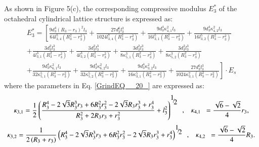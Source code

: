 \documentclass{article} %
\begin{document}
As shown in Figure 5(c), the corresponding compressive modulus $E_{3}^{*} $ of the octahedral cylindrical lattice structure is expressed as:
\begin{equation} \label{GrindEQ__20_} 
\begin{array}{l} {E_{3}^{*} =\left[\frac{9d_{3}^{4} \left(R_{3} -r_{3} \right)^{2} l_{3} }{64l_{3,4}^{5} \left(R_{3}^{2} -r_{3}^{2} \right)} +\right. \frac{27d_{3}^{6} l_{3}^{3} }{1024l_{3,4}^{7} \left(R_{3}^{2} -r_{3}^{2} \right)} +\frac{9d_{3}^{4} \kappa _{4,1}^{2} l_{3} }{16l_{3,1}^{5} \left(R_{3}^{2} -r_{3}^{2} \right)} +\frac{9d_{3}^{4} \kappa _{4,2}^{2} l_{3} }{16l_{3,2}^{5} \left(R_{3}^{2} -r_{3}^{2} \right)} } \\ {+\frac{3d_{3}^{2} l_{3}^{3} }{4l_{3,1}^{3} \left(R_{3}^{2} -r_{3}^{2} \right)} +\frac{3d_{3}^{2} l_{3}^{3} }{4l_{3,2}^{3} \left(R_{3}^{2} -r_{3}^{2} \right)} +\frac{3d_{3}^{2} l_{3}^{3} }{8\kappa _{5,1}^{3} \left(R_{3}^{2} -r_{3}^{2} \right)} +\frac{3d_{3}^{2} l_{3}^{3} }{8\kappa _{5,2}^{3} \left(R_{3}^{2} -r_{3}^{2} \right)} } \\ {+\frac{9d_{3}^{4} \kappa _{6,1}^{2} l_{3} }{32\kappa _{5,1}^{5} \left(R_{3}^{2} -r_{3}^{2} \right)} +\frac{9d_{3}^{4} \kappa _{6,2}^{2} l_{3} }{32\kappa _{5,2}^{5} \left(R_{3}^{2} -r_{3}^{2} \right)} +\frac{9d_{3}^{4} \kappa _{3,2}^{2} l_{3} }{16\kappa _{3,1}^{5} \left(R_{3}^{2} -r_{3}^{2} \right)} +\left. \frac{27d_{3}^{6} l_{3}^{3} }{1024\kappa _{3,1}^{7} \left(R_{3}^{2} -r_{3}^{2} \right)} \right]\cdot E_{s} } \end{array} 
\end{equation} 
where the parameters in Eq. \eqref{GrindEQ__20_} are expressed as:
\[\kappa _{3,1} =\frac{1}{2} \left(\frac{R_{3}^{4} -2\sqrt{3} R_{3}^{3} r_{3} +6R_{3}^{2} r_{3}^{2} -2\sqrt{3} R_{3} r_{3}^{3} +r_{3}^{4} }{R_{3}^{2} +2R_{3} r_{3} +r_{3}^{2} } +l_{3}^{2} \right)^{{\raise0.7ex\hbox{$ 1 $}\!\mathord{\left/{\vphantom{1 2}}\right.\kern-\nulldelimiterspace}\!\lower0.7ex\hbox{$ 2 $}} } \begin{array}{cc} {,} & {\kappa _{4,1} } \end{array}=\frac{\sqrt{6} -\sqrt{2} }{4} r_{3} ,\] 
\[\kappa _{3,2} =\frac{1}{2\left(R_{3} +r_{3} \right)} \left(R_{3}^{4} -2\sqrt{3} R_{3}^{3} r_{3} +6R_{3}^{2} r_{3}^{2} -2\sqrt{3} R_{3} r_{3}^{3} +r_{3}^{4} \right)^{{\raise0.7ex\hbox{$ 1 $}\!\mathord{\left/{\vphantom{1 2}}\right.\kern-\nulldelimiterspace}\!\lower0.7ex\hbox{$ 2 $}} } \begin{array}{cc} {,} & {\kappa _{4,2} } \end{array}=\frac{\sqrt{6} -\sqrt{2} }{4} R_{3} .\] 
\end{document}
